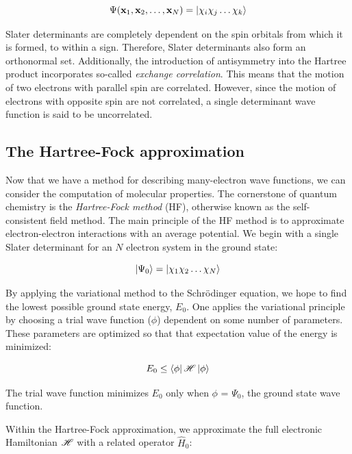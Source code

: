 \begin{equation}
  \Psi(\mathbf{x}_1,\mathbf{x}_2,\dots,\mathbf{x}_N) = \ket{\chi_i\chi_j\dots\chi_k}
\end{equation}

Slater determinants are completely dependent on the spin orbitals from which it is formed, to within a sign. Therefore, Slater determinants also form an orthonormal set. Additionally, the introduction of antisymmetry into the Hartree product incorporates so-called \emph{exchange correlation}. This means that the motion of two electrons with parallel spin are correlated. However, since the motion of electrons with opposite spin are not correlated, a single determinant wave function is said to be uncorrelated.

\subsection{The Hartree-Fock approximation}

Now that we have a method for describing many-electron wave functions, we can consider the computation of molecular properties. The cornerstone of quantum chemistry is the \emph{Hartree-Fock method} (HF), otherwise known as the self-consistent field method. The main principle of the HF method is to approximate electron-electron interactions with an average potential. We begin with a single Slater determinant for an $N$ electron system in the ground state:

\begin{equation}
\ket{\Psi_0} = \ket{\chi_1\chi_2\dots\chi_N}
\end{equation}

\noindent By applying the variational method to the Schr{\"o}dinger equation, we hope to find the lowest possible ground state energy, $E_0$. One applies the variational principle by choosing a trial wave function ($\phi$) dependent on some number of parameters. These parameters are optimized so that that expectation value of the energy is minimized:

\begin{equation}
  E_0 \leq \bra{\phi}\mathscr{H}\ket{\phi}
\end{equation}

\noindent The trial wave function minimizes $E_0$ only when $\phi$ = $\Psi_0$, the ground state wave function.

Within the Hartree-Fock approximation, we approximate the full electronic Hamiltonian $\mathscr{H}$ with a related operator $\hat{H}_0$:

